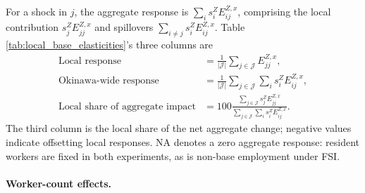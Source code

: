 \documentclass[12pt, unicode, a4paper]{article}
\newcommand{\1}{\mbox{1}\hspace{-0.25em}\mbox{l}} %
\begin{document}
For a shock in $j$, the aggregate response is $\sum_i s_i^ZE_{ij}^{Z,x}$, comprising the local contribution $s_j^ZE_{jj}^{Z,x}$ and spillovers $\sum_{i\ne j}s_i^ZE_{ij}^{Z,x}$. Table \ref{tab:local_base_elasticities}'s three columns are
\begin{align*}
    \text{Local response} &=\frac{1}{|\mathcal J|}\sum_{j\in\mathcal J}E_{jj}^{Z,x},\\
    \text{Okinawa-wide response} &=\frac{1}{|\mathcal J|}\sum_{j\in\mathcal J}\sum_i s_i^ZE_{ij}^{Z,x},\\
    \text{Local share of aggregate impact} &=100\frac{\sum_{j\in\mathcal J}s_j^ZE_{jj}^{Z,x}}{\sum_{j\in\mathcal J}\sum_i s_i^ZE_{ij}^{Z,x}}.
\end{align*}
The third column is the local share of the net aggregate change; negative values indicate offsetting local responses. NA denotes a zero aggregate response: resident workers are fixed in both experiments, as is non-base employment under FSI.

\paragraph{Worker-count effects.}

\end{document}
